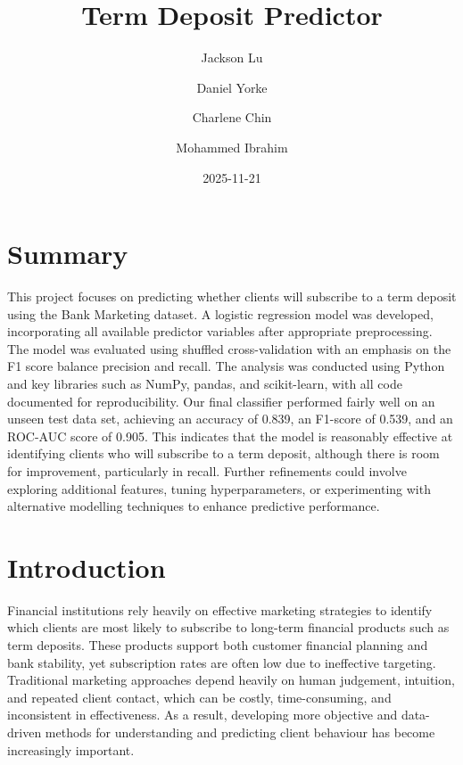 \documentclass[
  letterpaper,
  DIV=11,
  numbers=noendperiod]{scrartcl}
\title{Term Deposit Predictor}
\author{Jackson Lu \and Daniel Yorke \and Charlene Chin \and Mohammed
Ibrahim}
\date{2025-11-21}
\renewcommand*\contentsname{Table of contents}
\newcommand\contentsname{Table of contents}
\begin{document}
\maketitle

\renewcommand*\contentsname{Table of contents}
{
\hypersetup{linkcolor=}
\setcounter{tocdepth}{3}
\tableofcontents
}

\section{Summary}\label{summary}

This project focuses on predicting whether clients will subscribe to a
term deposit using the Bank Marketing dataset. A logistic regression
model was developed, incorporating all available predictor variables
after appropriate preprocessing. The model was evaluated using shuffled
cross-validation with an emphasis on the F1 score balance precision and
recall. The analysis was conducted using Python and key libraries such
as NumPy, pandas, and scikit-learn, with all code documented for
reproducibility. Our final classifier performed fairly well on an unseen
test data set, achieving an accuracy of 0.839, an F1-score of 0.539, and
an ROC-AUC score of 0.905. This indicates that the model is reasonably
effective at identifying clients who will subscribe to a term deposit,
although there is room for improvement, particularly in recall. Further
refinements could involve exploring additional features, tuning
hyperparameters, or experimenting with alternative modelling techniques
to enhance predictive performance.

\section{Introduction}\label{introduction}

Financial institutions rely heavily on effective marketing strategies to
identify which clients are most likely to subscribe to long-term
financial products such as term deposits. These products support both
customer financial planning and bank stability, yet subscription rates
are often low due to ineffective targeting. Traditional marketing
approaches depend heavily on human judgement, intuition, and repeated
client contact, which can be costly, time-consuming, and inconsistent in
effectiveness. As a result, developing more objective and data-driven
methods for understanding and predicting client behaviour has become
increasingly important.
\end{document}

